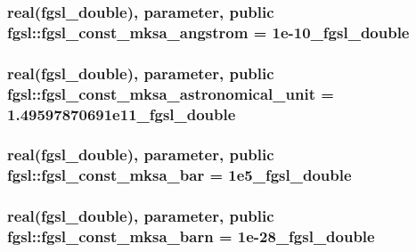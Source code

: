 \hypertarget{classfgsl_ae348f6545928612e5e56ed4174d31875}{
\subsubsection[{fgsl\-\_\-const\-\_\-mksa\-\_\-angstrom}]{\setlength{\rightskip}{0pt plus 5cm}real({\bf fgsl\-\_\-double}), parameter, public fgsl\-::fgsl\-\_\-const\-\_\-mksa\-\_\-angstrom = 1e-\/10\-\_\-fgsl\-\_\-double}}\label{classfgsl_ae348f6545928612e5e56ed4174d31875}
\hypertarget{classfgsl_aa2d41436d179db0d4d442c5207737611}{
\subsubsection[{fgsl\-\_\-const\-\_\-mksa\-\_\-astronomical\-\_\-unit}]{\setlength{\rightskip}{0pt plus 5cm}real({\bf fgsl\-\_\-double}), parameter, public fgsl\-::fgsl\-\_\-const\-\_\-mksa\-\_\-astronomical\-\_\-unit = 1.\-49597870691e11\-\_\-fgsl\-\_\-double}}\label{classfgsl_aa2d41436d179db0d4d442c5207737611}
\hypertarget{classfgsl_a218481ee71a34d944cbc21affd61bc8a}{
\subsubsection[{fgsl\-\_\-const\-\_\-mksa\-\_\-bar}]{\setlength{\rightskip}{0pt plus 5cm}real({\bf fgsl\-\_\-double}), parameter, public fgsl\-::fgsl\-\_\-const\-\_\-mksa\-\_\-bar = 1e5\-\_\-fgsl\-\_\-double}}\label{classfgsl_a218481ee71a34d944cbc21affd61bc8a}
\hypertarget{classfgsl_a859c8ea83a5175d31bc4240282c2b0b4}{
\subsubsection[{fgsl\-\_\-const\-\_\-mksa\-\_\-barn}]{\setlength{\rightskip}{0pt plus 5cm}real({\bf fgsl\-\_\-double}), parameter, public fgsl\-::fgsl\-\_\-const\-\_\-mksa\-\_\-barn = 1e-\/28\-\_\-fgsl\-\_\-double}}\label{classfgsl_a859c8ea83a5175d31bc4240282c2b0b4}
